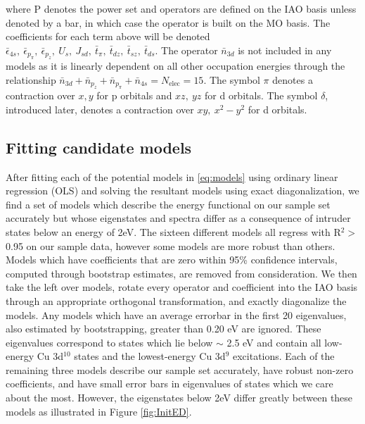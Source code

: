 \documentclass{article}
\begin{document}
where P denotes the power set and operators are defined on the IAO basis unless denoted by a bar, in which case the operator is built on the MO basis. The coefficients for each term above will be denoted $\bar{\epsilon}_{4s},\ \bar{\epsilon}_{p_\pi},\ \bar{\epsilon}_{p_z},\ U_s,\ J_{sd},\ \bar{t}_\pi,\ \bar{t}_{dz},\ \bar{t}_{sz},\ \bar{t}_{ds}$. The operator $\bar{n}_{3d}$ is not included in any models as it is linearly dependent on all other occupation energies through the relationship $\bar{n}_{3d} + \bar{n}_{p_z} + \bar{n}_{p_\pi} + \bar{n}_{4s} = N_\text{elec} = \text{15}$. The symbol $\pi$ denotes a contraction over $x, y$ for p orbitals and $xz,\ yz$ for d orbitals. The symbol $\delta$, introduced later, denotes a contraction over $xy,\ x^2-y^2$ for d orbitals.

\pagebreak
\subsection{Fitting candidate models}
After fitting each of the potential models in \eqref{eq:models} using ordinary linear regression (OLS) and solving the resultant models using exact diagonalization, we find a set of models which describe the energy functional on our sample set accurately but whose eigenstates and spectra differ as a consequence of intruder states below an energy of 2eV. 
The sixteen different models all regress with R$^2 >$ 0.95 on our sample data, however some models are more robust than others. 
Models which have coefficients that are zero within 95\% confidence intervals, computed through bootstrap estimates, are removed from consideration.
We then take the left over models, rotate every operator and coefficient into the IAO basis through an appropriate orthogonal transformation, and exactly diagonalize the models.
Any models which have an average errorbar in the first 20 eigenvalues, also estimated by bootstrapping, greater than 0.20 eV are ignored.
These eigenvalues correspond to states which lie below $\sim $ 2.5 eV and contain all low-energy Cu 3d$^{10}$ states and the lowest-energy Cu 3d$^{9}$ excitations.
Each of the remaining three models describe our sample set accurately, have robust non-zero coefficients, and have small error bars in eigenvalues of states which we care about the most.
However, the eigenstates below 2eV differ greatly between these models as illustrated in Figure \ref{fig:InitED}.
\end{document}
